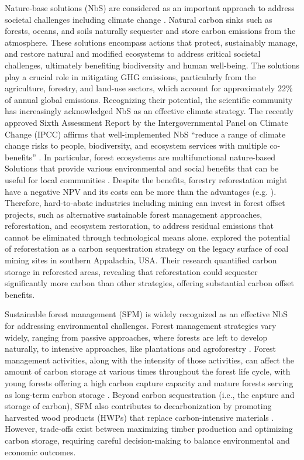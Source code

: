 \documentclass[preprint,12pt]{elsarticle}
\begin{document}
Nature-base solutions (NbS) are considered as an important approach to address societal challenges including climate change \citep{debele2023nature}. Natural carbon sinks such as forests, oceans, and soils naturally sequester and store carbon emissions from the atmosphere. These solutions encompass actions that protect, sustainably manage, and restore natural and modified ecosystems to address critical societal challenges, ultimately benefiting biodiversity and human well-being. The solutions play a crucial role in mitigating GHG emissions, particularly from the agriculture, forestry, and land-use sectors, which account for approximately 22\% of annual global emissions. Recognizing their potential, the scientific community has increasingly acknowledged NbS as an effective climate strategy. The recently approved Sixth Assessment Report by the Intergovernmental Panel on Climate Change (IPCC) affirms that well-implemented NbS ``reduce a range of climate change risks to people, biodiversity, and ecosystem services with multiple co-benefits'' \citep{Portner2022IPCC}. 
 In particular, forest ecosystems are multifunctional nature-based Solutions that provide various environmental and social benefits that can be useful for local communities \cite{salvatori2021forests}. Despite the benefits, forestry reforestation might have a negative NPV and its costs can be more than the advantages (e.g. \cite{schiappacasse2012assessing}). Therefore, hard-to-abate industries including mining can invest in forest offset projects, such as alternative sustainable forest management approaches, reforestation, and ecosystem restoration, to address residual emissions that cannot be eliminated through technological means alone. \citet{Fox2020} explored the potential of reforestation as a carbon sequestration strategy on the legacy surface of coal mining sites in southern Appalachia, USA. Their research quantified carbon storage in reforested areas, revealing that reforestation could sequester significantly more carbon than other strategies, offering substantial carbon offset benefits. 
 
Sustainable forest management (SFM) is widely recognized as an effective NbS for addressing environmental challenges. Forest management strategies vary widely, ranging from passive approaches, where forests are left to develop naturally, to intensive approaches, like plantations and agroforestry \citep{bettinger2013forest}.
Forest management activities, along with the intensity of those activities, can affect the amount of carbon storage at various times  throughout the forest life cycle, with young forests offering a high carbon capture capacity and mature forests serving as long-term carbon storage \citep{Waring2020}. Beyond carbon sequestration (i.e., the capture and storage of carbon), SFM also contributes to decarbonization by promoting harvested wood products (HWPs) that replace carbon-intensive materials \citep{papa2023modeling}.  However, trade-offs exist between maximizing timber production and optimizing carbon storage, requiring careful decision-making to balance environmental and economic outcomes. 
\end{document}
